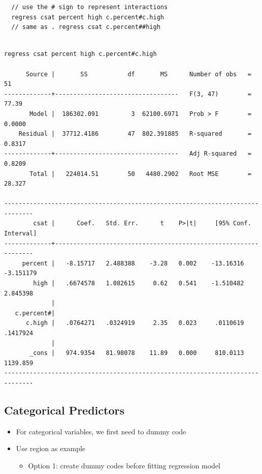 \documentclass[]{book}
\providecommand{\tightlist}{%
  \setlength{\itemsep}{0pt}\setlength{\parskip}{0pt}}
\begin{document}
\begin{verbatim}
  // use the # sign to represent interactions 
  regress csat percent high c.percent#c.high
  // same as . regress csat c.percent##high
\end{verbatim}

\begin{verbatim}

regress csat percent high c.percent#c.high

      Source |       SS           df       MS      Number of obs   =        51
-------------+----------------------------------   F(3, 47)        =     77.39
       Model |  186302.091         3  62100.6971   Prob > F        =    0.0000
    Residual |  37712.4186        47  802.391885   R-squared       =    0.8317
-------------+----------------------------------   Adj R-squared   =    0.8209
       Total |   224014.51        50   4480.2902   Root MSE        =    28.327

------------------------------------------------------------------------------
        csat |      Coef.   Std. Err.      t    P>|t|     [95% Conf. Interval]
-------------+----------------------------------------------------------------
     percent |   -8.15717   2.488388    -3.28   0.002    -13.16316   -3.151179
        high |   .6674578   1.082615     0.62   0.541    -1.510482    2.845398
             |
   c.percent#|
      c.high |   .0764271   .0324919     2.35   0.023     .0110619    .1417924
             |
       _cons |   974.9354   81.98078    11.89   0.000     810.0113    1139.859
------------------------------------------------------------------------------
\end{verbatim}

\subsection{Categorical Predictors}\label{categorical-predictors}

\begin{itemize}
\tightlist
\item
  For categorical variables, we first need to dummy code
\item
  Use region as example

  \begin{itemize}
  \tightlist
  \item
    Option 1: create dummy codes before fitting regression model
  \end{itemize}
\end{itemize}
\end{document}
